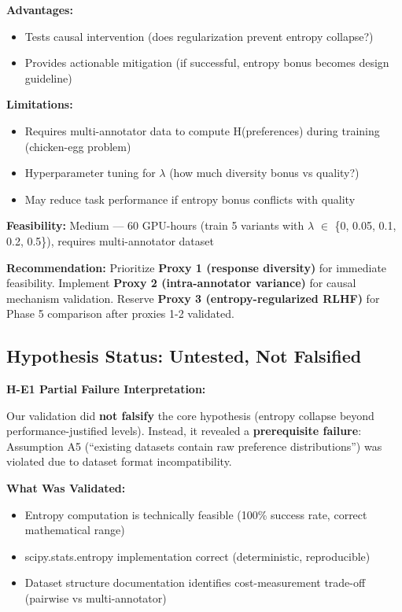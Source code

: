 \textbf{Advantages:}
\begin{itemize}
\item Tests causal intervention (does regularization prevent entropy collapse?)
\item Provides actionable mitigation (if successful, entropy bonus becomes design guideline)
\end{itemize}

\textbf{Limitations:}
\begin{itemize}
\item Requires multi-annotator data to compute H(preferences) during training (chicken-egg problem)
\item Hyperparameter tuning for $\lambda$ (how much diversity bonus vs quality?)
\item May reduce task performance if entropy bonus conflicts with quality
\end{itemize}

\textbf{Feasibility:} Medium — 60 GPU-hours (train 5 variants with $\lambda$ $\in$ \{0, 0.05, 0.1, 0.2, 0.5\}), requires multi-annotator dataset

\textbf{Recommendation:} Prioritize \textbf{Proxy 1 (response diversity)} for immediate feasibility. Implement \textbf{Proxy 2 (intra-annotator variance)} for causal mechanism validation. Reserve \textbf{Proxy 3 (entropy-regularized RLHF)} for Phase 5 comparison after proxies 1-2 validated.

\subsection{Hypothesis Status: Untested, Not Falsified}

\textbf{H-E1 Partial Failure Interpretation:}

Our validation did \textbf{not falsify} the core hypothesis (entropy collapse beyond performance-justified levels). Instead, it revealed a \textbf{prerequisite failure}: Assumption A5 (``existing datasets contain raw preference distributions'') was violated due to dataset format incompatibility.

\textbf{What Was Validated:}
\begin{itemize}
\item \checkmark Entropy computation is technically feasible (100\% success rate, correct mathematical range)
\item \checkmark scipy.stats.entropy implementation correct (deterministic, reproducible)
\item \checkmark Dataset structure documentation identifies cost-measurement trade-off (pairwise vs multi-annotator)
\end{itemize}

